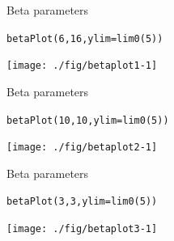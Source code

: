 \documentclass[xcolor=table,           xcolor=dvipsnames]{beamer}\usepackage[]{graphicx}\usepackage[]{color}
\makeatletter
\newcommand{\hlnum}[1]{\textcolor[rgb]{0,0,0}{#1}}
\newcommand{\hlstd}[1]{\textcolor[rgb]{0,0,0}{#1}}
\newcommand{\hlkwc}[1]{\textcolor[rgb]{1,0,1}{#1}}
\newcommand{\hlkwd}[1]{\textcolor[rgb]{0,0,1}{#1}}
\newenvironment{kframe}{%
 \def\at@end@of@kframe{}%
 \ifinner\ifhmode%
  \def\at@end@of@kframe{\end{minipage}}%
  \begin{minipage}{\columnwidth}%
 \fi\fi%
 \def\FrameCommand##1{\hskip\@totalleftmargin \hskip-\fboxsep
 \colorbox{shadecolor}{##1}\hskip-\fboxsep
     \hskip-\linewidth \hskip-\@totalleftmargin \hskip\columnwidth}%
 \MakeFramed {\advance\hsize-\width
   \@totalleftmargin\z@ \linewidth\hsize
   \@setminipage}}%
 {\par\unskip\endMakeFramed%
 \at@end@of@kframe}
\newenvironment{knitrout}{}{} %
\makeatother
\begin{document}

\begin{frame}[fragile]{Beta parameters}
\begin{knitrout}
\color{fgcolor}\begin{kframe}
\begin{alltt}
\hlkwd{betaPlot}\hlstd{(}\hlnum{6}\hlstd{,} \hlnum{16}\hlstd{,} \hlkwc{ylim}\hlstd{=}\hlkwd{lim0}\hlstd{(}\hlnum{5}\hlstd{))}
\end{alltt}
\end{kframe}

{\centering \texttt{[image: ./fig/betaplot1-1]} 

}



\end{knitrout}
\end{frame}


\begin{frame}[fragile]{Beta parameters}
\begin{knitrout}
\color{fgcolor}\begin{kframe}
\begin{alltt}
\hlkwd{betaPlot}\hlstd{(}\hlnum{10}\hlstd{,} \hlnum{10}\hlstd{,} \hlkwc{ylim}\hlstd{=}\hlkwd{lim0}\hlstd{(}\hlnum{5}\hlstd{))}
\end{alltt}
\end{kframe}

{\centering \texttt{[image: ./fig/betaplot2-1]} 

}



\end{knitrout}
\end{frame}


\begin{frame}[fragile]{Beta parameters}
\begin{knitrout}
\color{fgcolor}\begin{kframe}
\begin{alltt}
\hlkwd{betaPlot}\hlstd{(}\hlnum{3}\hlstd{,} \hlnum{3}\hlstd{,} \hlkwc{ylim}\hlstd{=}\hlkwd{lim0}\hlstd{(}\hlnum{5}\hlstd{))}
\end{alltt}
\end{kframe}

{\centering \texttt{[image: ./fig/betaplot3-1]} 

}



\end{knitrout}
\end{frame}
\end{document}
